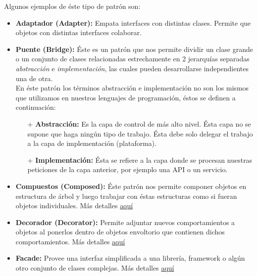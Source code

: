 \documentclass[12pt,article,oneside]{memoir}
\begin{document}
		Algunos ejemplos de \'este tipo de patr\'on son:
		\begin{itemize}
			\item \textbf{Adaptador (Adapter):} Empata interfaces con distintas clases. Permite que objetos con distintas 
			interfaces colaborar.
			
			\item \textbf{Puente (Bridge):} \'Este es un patr\'on que nos permite dividir un clase grande o un conjunto de 
			clases relacionadas estrechamente en 2 jerarqu\'ias separadas \textit{abstracci\'on} e \textit{implementaci\'on}, 
			las cuales pueden desarrollarse independientes una de otra.\\
			
			En \'este patr\'on los t\'erminos abstracci\'on e implementaci\'on no son los mismos que utilizamos en nuestros
			lenguajes de programaci\'on, \'estos se definen a continuaci\'on:
			\begin{itemize}
				\item[+] \textbf{Abstracci\'on:} Es la capa de control de m\'as alto nivel. \'Esta capa no se supone que haga 
				ning\'un tipo de trabajo. \'Esta debe solo delegar el trabajo a la capa de implementaci\'on (plataforma).
				
				\item[+] \textbf{Implementaci\'on:} \'Esta se refiere a la capa donde se procesan nuestras peticiones de la 
				capa anterior, por ejemplo una API o un servicio.
			\end{itemize}
			
			\item \textbf{Compuestos (Composed):} \'Este patr\'on nos permite componer objetos en estructura de \'arbol y 
			luego trabajar con \'estas estructuras como si fueran objetos individuales. 
			M\'as detalles \href{https://refactoring.guru/design-patterns/composite}{aqu\'i}
			
			\item \textbf{Decorador (Decorator):} Permite adjuntar nuevos comportamientos a objetos al ponerlos dentro de 
			objetos envoltorio que contienen dichos comportamientos.
			M\'as detalles \href{https://refactoring.guru/design-patterns/decorator}{aqu\'i}
			
			\item \textbf{Facade:} Provee una interfaz simplificada a una librer\'ia, framework o alg\'un otro conjunto de 
			clases complejas. M\'as detalles \href{https://refactoring.guru/design-patterns/facade}{aqu\'i}\\ \\
			

\end{itemize}
\end{document}
